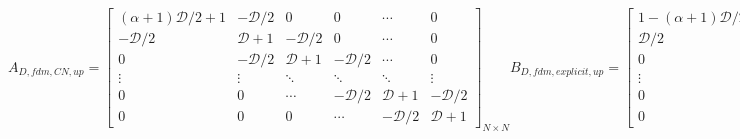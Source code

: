 \begin{subequations}
  \begin{equation}
    A_{D,fdm,CN,up} = \begin{bmatrix}
      (\alpha+1)\mathcal{D}/2+1 & -\mathcal{D}/2 & 0 & 0 & \cdots & 0 \\
      -\mathcal{D}/2 & \mathcal{D}+1 & -\mathcal{D}/2 & 0 & \cdots & 0 \\
      0 & -\mathcal{D}/2 & \mathcal{D}+1 & -\mathcal{D}/2 & \cdots & 0 \\
      \vdots & \vdots & \ddots & \ddots & \ddots & \vdots \\
      0 & 0 & \cdots & -\mathcal{D}/2 & \mathcal{D}+1 & -\mathcal{D}/2\\
      0 & 0 & 0 & \cdots & -\mathcal{D}/2 & \mathcal{D}+1
    \end{bmatrix}_{N\times N}
  \end{equation}
  \begin{equation}
    B_{D,fdm,explicit,up} = \begin{bmatrix}
      1-(\alpha+1)\mathcal{D}/2 & \mathcal{D}/2 & 0 & 0 & \cdots & 0 \\
      \mathcal{D}/2 & 1-\mathcal{D} & \mathcal{D}/2 & 0 & \cdots & 0 \\
      0 & \mathcal{D}/2 & 1-\mathcal{D} & \mathcal{D}/2 & \cdots & 0 \\
      \vdots & \vdots & \ddots & \ddots & \ddots & \vdots \\
      0 & 0 & \cdots & \mathcal{D}/2 & 1-\mathcal{D} & \mathcal{D}/2 \\
      0 & 0 & 0 & \cdots & \mathcal{D}/2 & 1-\mathcal{D}
      \end{bmatrix}_{N\times N}
  \end{equation}
  \begin{equation}
    A_{A,fdm,CN,up} = \begin{bmatrix}
      \alpha\mathcal{U}/2 & 0 & \cdots & 0 \\
      -\mathcal{U}/2 & \mathcal{U}/2 & \cdots & 0 \\
      \vdots & \ddots & \ddots  & \vdots \\
      0 & \cdots & -\mathcal{U}/2 & \mathcal{U}/2
    \end{bmatrix}_{N\times N}
  \end{equation}
  \begin{equation}
    B_{A,fdm,explicit,up} = \begin{bmatrix}
      -\alpha\mathcal{U}/2 & 0 & \cdots & 0 \\
      \mathcal{U}/2 & -\mathcal{U}/2 & \cdots & 0 \\
      \vdots & \ddots & \ddots  & \vdots \\
      0 & \cdots & \mathcal{U}/2 & -\mathcal{U}/2
      \end{bmatrix}_{N\times N}
  \end{equation}
  \begin{equation}
    b_{fdm,explicit,up} = \{\alpha(\mathcal{D}+\mathcal{U})c_{Feed}, 0, \dots, 0\}_{1\times N}^T
  \end{equation}
\end{subequations}

